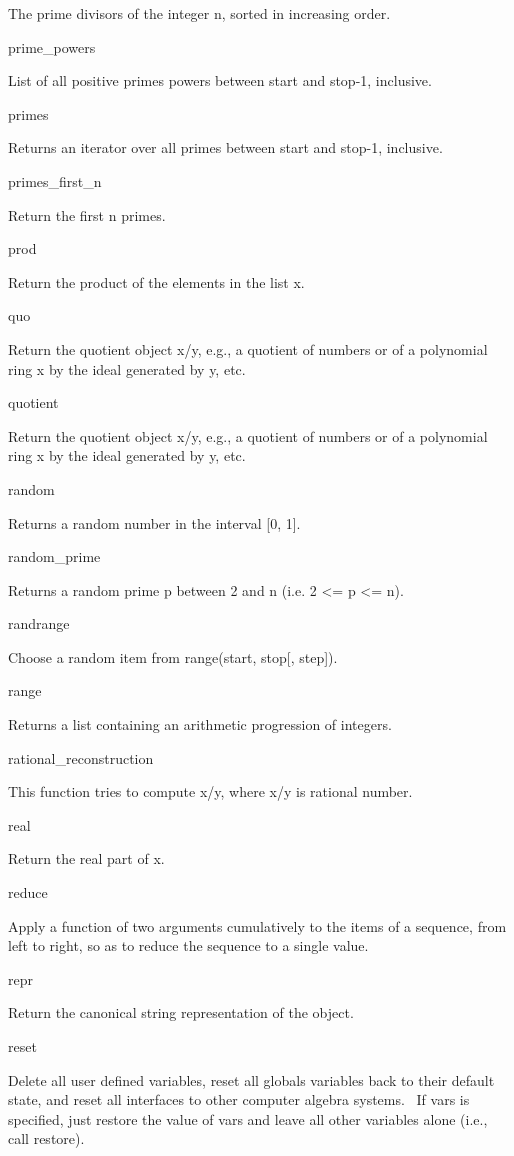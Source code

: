 \documentclass[12pt,twoside]{book}
\begin{document}
The prime divisors of the integer n, sorted in increasing order.

prime\_powers

List of all positive primes powers between start and stop{}-1,
inclusive.

primes

Returns an iterator over all primes between start and stop{}-1,
inclusive.

primes\_first\_n

Return the first n primes.

prod

Return the product of the elements in the list x.

quo

Return the quotient object x/y, e.g., a quotient of numbers or of a
polynomial ring x by the ideal generated by y, etc.

quotient

Return the quotient object x/y, e.g., a quotient of numbers or of a
polynomial ring x by the ideal generated by y, etc.

random

Returns a random number in the interval [0, 1].

random\_prime

Returns a random prime p between 2 and n (i.e. 2 {\textless}= p
{\textless}= n).

randrange

Choose a random item from range(start, stop[, step]).

range

Returns a list containing an arithmetic progression of integers.

rational\_reconstruction

This function tries to compute x/y, where x/y is rational number.

real

Return the real part of x.

reduce

Apply a function of two arguments cumulatively to the items of a
sequence, from left to right, so as to reduce the sequence to a single
value.

repr

Return the canonical string representation of the object.

reset

Delete all user defined variables, reset all globals variables back to
their default state, and reset all interfaces to other computer algebra
systems. \ If vars is specified, just restore the value of vars and
leave all other variables alone (i.e., call restore).
\end{document}
